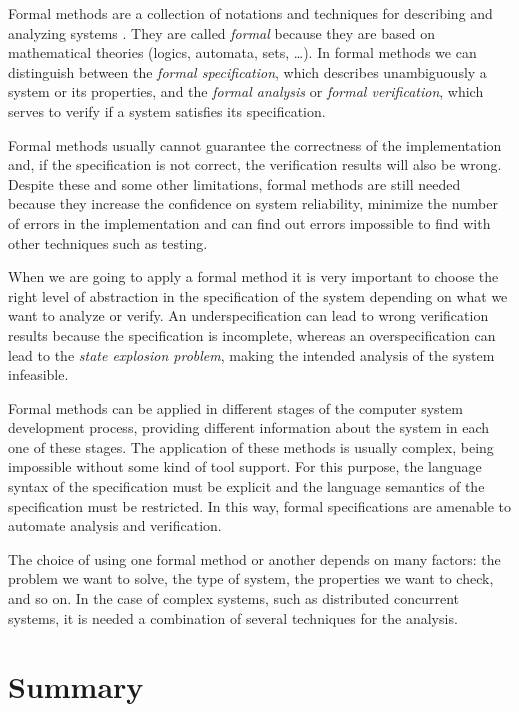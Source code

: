Formal methods \cite{Wing1990} are a collection of notations and techniques for describing and analyzing systems \cite{Peled2001}. They are called \textit{formal} because they are based on mathematical theories (logics, automata, sets, \ldots). In formal methods we can distinguish between the \textit{formal specification}, which describes unambiguously a system or its properties, and the \textit{formal analysis} or \textit{formal verification}, which serves to verify if a system satisfies its specification.

Formal methods usually cannot guarantee the correctness of the implementation and, if the specification is not correct, the verification results will also be wrong. Despite these and some other limitations, formal methods are still needed because they increase the confidence on system reliability, minimize the number of errors in the implementation and can find out errors impossible to find with other techniques such as testing.

When we are going to apply a formal method it is very important to choose the right level of abstraction in the specification of the system depending on what we want to analyze or verify. An underspecification can lead to wrong verification results because the specification is incomplete, whereas an overspecification can lead to the \textit{state explosion problem}, making the intended analysis of the system infeasible.

Formal methods can be applied in different stages of the computer system development process, providing different information about the system in each one of these stages. The application of these methods is usually complex, being impossible without some kind of tool support. For this purpose, the language syntax of the specification must be explicit and the language semantics of the specification must be restricted. In this way, formal specifications are amenable to automate analysis and verification.

The choice of using one formal method or another depends on many factors: the problem we want to solve, the type of system, the properties we want to check, and so on. In the case of complex systems, such as distributed concurrent systems, it is needed a combination of several techniques for the analysis.


\section{Summary}\label{sumWebServ}

